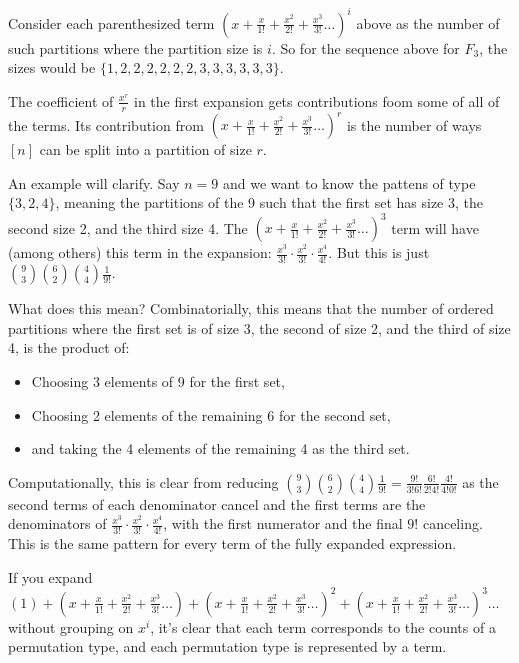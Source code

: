 \documentclass[11pt, oneside]{article} 	%
\begin{document}
Consider each parenthesized term $(x + \frac{x}{1!} + \frac{x^2}{2!} + \frac{x^3}{3!} \dots)^i$ above as the number of such partitions where the partition size is $i$.  So for the sequence above for $F_3$, the sizes would be $\{1,2,2,2,2,2,2,3,3,3,3,3,3\}$.


The coefficient of $\frac{x^r}{r}$ in the first expansion gets contributions foom some of all of the terms.  Its contribution from $(x + \frac{x}{1!} + \frac{x^2}{2!} + \frac{x^3}{3!} \dots)^r$ is the number of ways $[n]$ can be split into a partition of size $r$.

An example will clarify.  Say $n=9$ and we want to know the pattens of type $\{3,2,4\}$, meaning the partitions of the 9 such that the first set has size 3, the second size 2, and the third size 4.  The 
$(x + \frac{x}{1!} + \frac{x^2}{2!} + \frac{x^3}{3!} \dots)^3$ term will have (among others) this term in  the expansion: $\frac{x^3}{3!} \cdot \frac{x^2}{3!} \cdot \frac{x^4}{4!}$.    But this is just $\binom{9}{3}\binom{6}{2}\binom{4}{4}\frac{1}{9!}$.

What does this mean?  Combinatorially, this means that the number of ordered partitions where the first set is of size 3, the second of size 2, and the third of size 4, is the product of:
\begin{itemize}
\item Choosing 3 elements of 9 for the first set,
\item Choosing 2 elements of the remaining 6 for the second set,
\item and taking the 4 elements of the remaining 4 as the third set.
\end{itemize}

Computationally, this is clear from reducing $\binom{9}{3}\binom{6}{2}\binom{4}{4}\frac{1}{9!} = \frac{9!}{3!6!}\frac{6!}{2!4!}\frac{4!}{4!0!}$ as the second terms of each denominator cancel and the first terms are the denominators of  $\frac{x^3}{3!} \cdot \frac{x^2}{3!} \cdot \frac{x^4}{4!}$, with the first numerator and the final $9!$ canceling.  This is the same pattern for every term of the fully expanded expression.

If you expand $(1) + (x + \frac{x}{1!} + \frac{x^2}{2!} + \frac{x^3}{3!} \dots) +  (x + \frac{x}{1!} + \frac{x^2}{2!} + \frac{x^3}{3!} \dots)^2 +   (x + \frac{x}{1!} + \frac{x^2}{2!} + \frac{x^3}{3!} \dots)^3 \dots$  without grouping on $x^i$, it's clear that each term corresponds to the counts of a permutation type, and each permutation type is represented by a term.  
\end{document}

